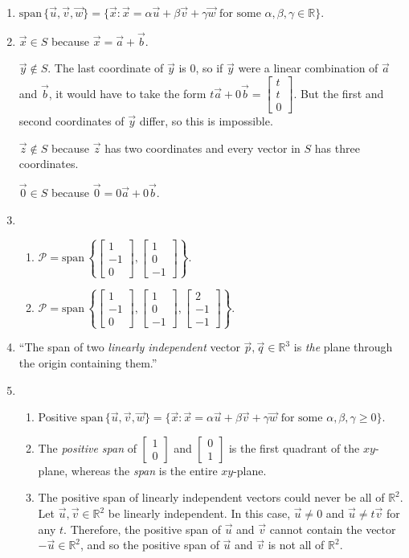 \documentclass[red]{tutorial}
\newcommand{\R}{\mathbb{R}}
\newcommand{\Span}{\mathrm{span}\,}
\newcommand{\mat}[1]{\begin{bmatrix}#1\end{bmatrix}}
\theoremstyle{definition}
\theoremstyle{theorem}
\begin{document}
	\begin{solutions}
		\begin{enumerate}
			\item $\Span\{\vec u,\vec v,\vec w\}=\{\vec x:\vec x=\alpha\vec u+\beta\vec v+\gamma \vec w\text{ for some }\alpha,\beta,\gamma\in \R\}$.
			\item $\vec x\in S$ because $\vec x=\vec a+\vec b$.
				
				$\vec y\notin S$. The last coordinate of $\vec y$ is $0$, so if $\vec y$ were a linear combination of
				$\vec a$ and $\vec b$, it would have to take the form $t\vec a+0\vec b=\mat{t\\t\\0}$. But the first
				and second coordinates of $\vec y$ differ, so this is impossible.

				$\vec z\notin S$ because $\vec z$ has two coordinates and every vector in $S$ has three
				coordinates.
				
				$\vec 0\in S$ because $\vec 0=0\vec a+0\vec b$.
			\item \begin{enumerate}
					\item $\mathcal P=\Span\left\{\mat{1\\-1\\0},\mat{1\\0\\-1}\right\}$.
					\item $\mathcal P=\Span\left\{\mat{1\\-1\\0},\mat{1\\0\\-1}, \mat{2\\-1\\-1}\right\}$.
			\end{enumerate}
			\item ``The span of two \emph{linearly independent} vector $\vec p,\vec q\in \R^3$ is \emph{the} plane through
				the origin containing them.''
			\item \begin{enumerate}
				\item Positive $\Span\{\vec u,\vec v,\vec w\}=\{\vec x:\vec x=\alpha\vec u+\beta\vec v+\gamma \vec w\text{ for some }\alpha,\beta,\gamma\geq 0\}$.
				\item The \emph{positive span} of $\mat{1\\0}$ and $\mat{0\\1}$ is the first quadrant of the $xy$-plane, whereas
					the \emph{span} is the entire $xy$-plane.
				\item The positive span of linearly independent vectors could never be all of $\R^2$. 
					Let $\vec u,\vec v\in \R^2$ be linearly independent. 
					In this case, $\vec u\neq 0$ and $\vec u\neq t\vec v$ for any $t$.
					Therefore, the positive span of $\vec u$ and $\vec v$ cannot contain the vector $-\vec u\in \R^2$,
					and so the positive span of $\vec u$ and $\vec v$ is not all of $\R^2$.


\end{enumerate}
\end{enumerate}
\end{solutions}
\end{document}
